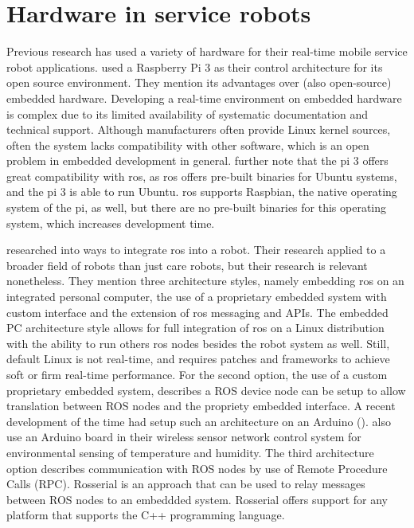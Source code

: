 \documentclass[12pt]{scrreprt}
\begin{document}
\section{Hardware in service robots}
\label{tHardware}
Previous research has used a variety of hardware for their real-time mobile service robot applications. \citeauthor{delgado} used a Raspberry Pi 3 as their control architecture for its open source environment. They mention its advantages over (also open-source) embedded hardware. Developing a real-time environment on embedded hardware is complex due to its limited availability of systematic documentation and technical support. Although manufacturers often provide Linux kernel sources, often the system lacks compatibility with other software, which is an open problem in embedded development in general. \citeauthor{delgado} further note that the \gls{pi} 3 offers great compatibility with \acrfull{ros}, as \acrshort{ros} offers pre-built binaries for Ubuntu systems, and the \gls{pi} 3 is able to run Ubuntu. \acrshort{ros} supports Raspbian, the native operating system of the \gls{pi}, as well, but there are no pre-built  binaries for this operating system, which increases development time.
\par
\cite{bouchier} researched into ways to integrate \acrshort{ros} into a robot. Their research applied to a broader field of robots than just care robots, but their research is relevant nonetheless. They mention three architecture styles, namely embedding \acrshort{ros} on an integrated personal computer, the use of a proprietary embedded system with custom interface and the extension of \acrshort{ros} messaging and APIs. The embedded PC architecture style allows for full integration of \acrshort{ros} on a Linux distribution with the ability to run others \acrshort{ros} nodes besides the robot system as well. Still, default Linux is not real-time, and requires patches and frameworks to achieve soft or firm real-time performance. For the second option, the use of a custom proprietary embedded system, \cite{bouchier} describes a ROS device node can be setup to allow translation between ROS nodes and the propriety embedded interface. A recent development of the time had setup such an architecture on an Arduino (\cite{bouchier}). \cite{arduino} also use an Arduino board in their wireless sensor network control system for environmental sensing of temperature and humidity. The third architecture  option describes communication with ROS nodes by use of Remote Procedure Calls (RPC). Rosserial is an approach that can be used to relay messages between ROS nodes to an embeddded system. Rosserial offers support for any platform that supports the C++ programming language.
\end{document}
